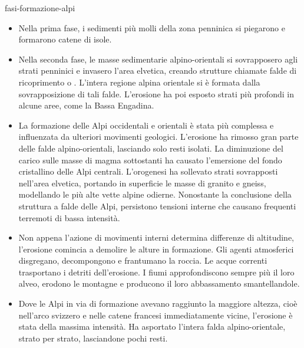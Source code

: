 \documentclass[preview]{standalone}
\begin{document}
\begin{snippet}{fasi-formazione-alpi}
    \vspace{-0.9cm}
    \begin{itemize}
        \item Nella prima fase, i sedimenti più molli della zona penninica si piegarono e formarono
        catene di isole.
        \item Nella seconda fase, le masse sedimentarie alpino-orientali si sovrapposero agli strati
        penninici e invasero l'area elvetica, creando strutture chiamate falde di ricoprimento o
        . L'intera regione alpina orientale si è formata dalla sovrapposizione di tali falde.
        L'erosione ha poi esposto strati più profondi in alcune aree, come la Bassa Engadina.
        \item La formazione delle Alpi occidentali e orientali è stata più complessa e influenzata da
        ulteriori movimenti geologici. L'erosione ha rimosso gran parte delle falde alpino-orientali,
        lasciando solo resti isolati. La diminuzione del carico sulle masse di magma sottostanti ha
        causato l'emersione del fondo cristallino delle Alpi centrali. L'orogenesi ha sollevato strati
        sovrapposti nell'area elvetica, portando in superficie le masse di granito e gneiss,
        modellando le più alte vette alpine odierne. Nonostante la conclusione della struttura a
        falde delle Alpi, persistono tensioni interne che causano frequenti terremoti di bassa
        intensità.
        \item Non appena l'azione di movimenti interni determina differenze di altitudine, l'erosione
        comincia a demolire le alture in formazione. Gli agenti atmosferici disgregano,
        decompongono e frantumano la roccia. Le acque correnti trasportano i detriti dell'erosione.
        I fiumi approfondiscono sempre più il loro alveo, erodono le montagne e producono il loro
        abbassamento smantellandole.
        \item Dove le Alpi in via di formazione avevano raggiunto la maggiore altezza, cioè nell'arco
        svizzero e nelle catene francesi immediatamente vicine, l'erosione è stata della massima
        intensità. Ha asportato l'intera falda alpino-orientale, strato per strato, lasciandone pochi
        resti.
    \end{itemize}
\end{snippet}
\end{document}
